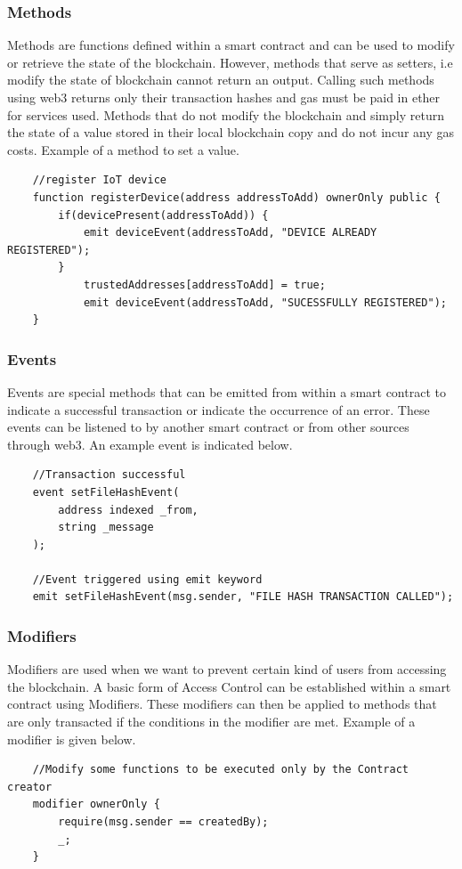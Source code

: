 \documentclass[11pt,openright]{report}
\begin{document}
\subsubsection{Methods}
Methods are functions defined within a smart contract and can be used to modify or retrieve the state of the blockchain. However, methods that serve as setters, i.e modify the state of blockchain cannot return an output. Calling such methods using web3 returns only their transaction hashes and gas must be paid in ether for services used. Methods that do not modify the blockchain and simply return the state of a value stored in their local blockchain copy and do not incur any gas costs. Example of a method to set a value.
\begin{verbatim}
    //register IoT device
    function registerDevice(address addressToAdd) ownerOnly public {
        if(devicePresent(addressToAdd)) {
            emit deviceEvent(addressToAdd, "DEVICE ALREADY REGISTERED");
        }
            trustedAddresses[addressToAdd] = true;
            emit deviceEvent(addressToAdd, "SUCESSFULLY REGISTERED");
    }
\end{verbatim}


\subsubsection{Events}
Events are special methods that can be emitted from within a smart contract to indicate a successful transaction or indicate the occurrence of an error. These events can be listened to by another smart contract or from other sources through web3. An example event is indicated below.
\begin{verbatim}
    //Transaction successful
    event setFileHashEvent(
        address indexed _from,
        string _message
    );
    
    //Event triggered using emit keyword
    emit setFileHashEvent(msg.sender, "FILE HASH TRANSACTION CALLED");
\end{verbatim}


\subsubsection{Modifiers}
Modifiers are used when we want to prevent certain kind of users from accessing the blockchain. A basic form of Access Control can be established within a smart contract using Modifiers. These modifiers can then be applied to methods that are only transacted if the conditions in the modifier are met. Example of a modifier is given below.
\begin{verbatim}
    //Modify some functions to be executed only by the Contract creator
    modifier ownerOnly {
        require(msg.sender == createdBy);
        _;
    }
\end{verbatim}
\end{document}
